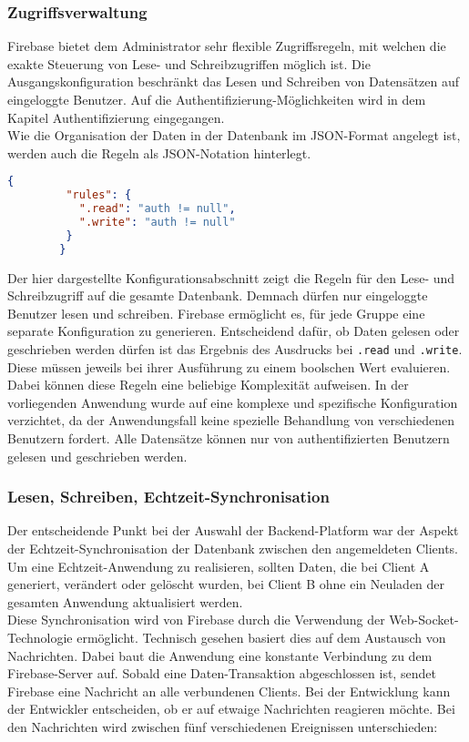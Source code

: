 \subsubsection{Zugriffsverwaltung}
Firebase bietet dem Administrator sehr flexible Zugriffsregeln, mit welchen die exakte Steuerung von Lese- und Schreibzugriffen möglich ist.
Die Ausgangskonfiguration beschränkt das Lesen und Schreiben von Datensätzen auf eingeloggte Benutzer. Auf die Authentifizierung-Möglichkeiten wird in dem Kapitel Authentifizierung eingegangen.\\
Wie die Organisation der Daten in der Datenbank im JSON-Format angelegt ist, werden auch die Regeln als JSON-Notation hinterlegt.

       
       
\begin{lstlisting}[language=JSON, label=code_AccessRuleDatabase, caption=Beispiel-Konfiguration für Datenbankzugriffe]
		{
         "rules": {
           ".read": "auth != null",
           ".write": "auth != null"
         }
  		}
\end{lstlisting}

Der hier dargestellte Konfigurationsabschnitt zeigt die Regeln für den Lese- und Schreibzugriff auf die gesamte Datenbank. Demnach dürfen nur eingeloggte Benutzer lesen und schreiben. Firebase ermöglicht es, für jede Gruppe eine separate Konfiguration zu generieren.
Entscheidend dafür, ob Daten gelesen oder geschrieben werden dürfen ist das Ergebnis des Ausdrucks bei \texttt{.read} und \texttt{.write}. Diese müssen jeweils bei ihrer Ausführung zu einem boolschen Wert evaluieren. Dabei können diese Regeln eine beliebige
Komplexität aufweisen.
In der vorliegenden Anwendung wurde auf eine komplexe und spezifische Konfiguration verzichtet, da der Anwendungsfall keine spezielle Behandlung von verschiedenen Benutzern fordert.
Alle Datensätze können nur von authentifizierten Benutzern gelesen und geschrieben werden.

\subsubsection{Lesen, Schreiben, Echtzeit-Synchronisation}
Der entscheidende Punkt bei der Auswahl der Backend-Platform war der Aspekt der Echtzeit-Synchronisation der Datenbank zwischen den angemeldeten Clients.
Um eine Echtzeit-Anwendung zu realisieren, sollten Daten, die bei Client A generiert, verändert oder gelöscht wurden, bei Client B ohne ein Neuladen der gesamten Anwendung aktualisiert werden.\\
Diese Synchronisation wird von Firebase durch die Verwendung der Web-Socket-Technologie ermöglicht. Technisch gesehen basiert dies auf dem Austausch von Nachrichten. Dabei baut die Anwendung eine konstante Verbindung
zu dem Firebase-Server auf. Sobald eine Daten-Transaktion abgeschlossen ist, sendet Firebase eine Nachricht an alle verbundenen Clients. Bei der Entwicklung kann der Entwickler entscheiden, ob er auf etwaige Nachrichten reagieren möchte.
Bei den Nachrichten wird zwischen fünf verschiedenen Ereignissen unterschieden:

